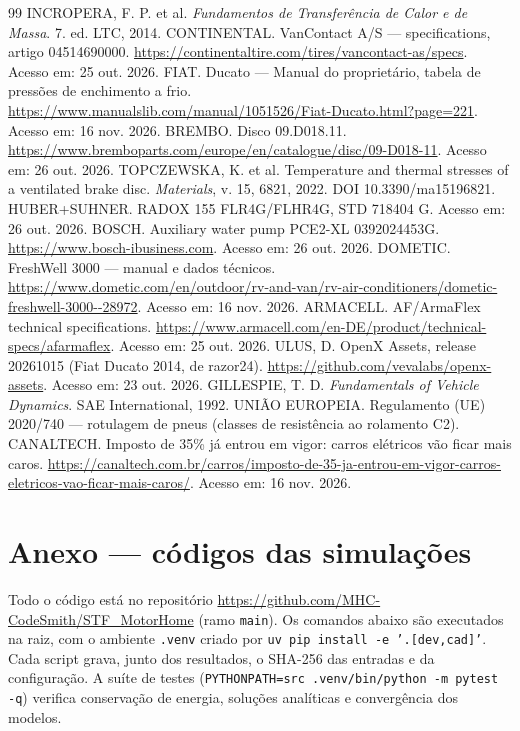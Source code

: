\documentclass[11pt,a4paper]{article}
\newcommand{\cod}[1]{\texttt{\small #1}}
\begin{document}
\begin{thebibliography}{99}
 INCROPERA, F. P. et al. \emph{Fundamentos de Transferência de Calor e de Massa}. 7. ed. LTC, 2014.
 CONTINENTAL. VanContact A/S — specifications, artigo 04514690000. \url{https://continentaltire.com/tires/vancontact-as/specs}. Acesso em: 25 out. 2026.
 FIAT. Ducato — Manual do proprietário, tabela de pressões de enchimento a frio. \url{https://www.manualslib.com/manual/1051526/Fiat-Ducato.html?page=221}. Acesso em: 16 nov. 2026.
 BREMBO. Disco 09.D018.11. \url{https://www.bremboparts.com/europe/en/catalogue/disc/09-D018-11}. Acesso em: 26 out. 2026.
 TOPCZEWSKA, K. et al. Temperature and thermal stresses of a ventilated brake disc. \emph{Materials}, v. 15, 6821, 2022. DOI 10.3390/ma15196821.
 HUBER+SUHNER. RADOX 155 FLR4G/FLHR4G, STD 718404 G. Acesso em: 26 out. 2026.
 BOSCH. Auxiliary water pump PCE2-XL 0392024453G. \url{https://www.bosch-ibusiness.com}. Acesso em: 26 out. 2026.
 DOMETIC. FreshWell 3000 — manual e dados técnicos. \url{https://www.dometic.com/en/outdoor/rv-and-van/rv-air-conditioners/dometic-freshwell-3000--28972}. Acesso em: 16 nov. 2026.
 ARMACELL. AF/ArmaFlex technical specifications. \url{https://www.armacell.com/en-DE/product/technical-specs/afarmaflex}. Acesso em: 25 out. 2026.
 ULUS, D. OpenX Assets, release 20261015 (Fiat Ducato 2014, de razor24). \url{https://github.com/vevalabs/openx-assets}. Acesso em: 23 out. 2026.
 GILLESPIE, T. D. \emph{Fundamentals of Vehicle Dynamics}. SAE International, 1992.
 UNIÃO EUROPEIA. Regulamento (UE) 2020/740 — rotulagem de pneus (classes de resistência ao rolamento C2).
 CANALTECH. Imposto de 35\% já entrou em vigor: carros elétricos vão ficar mais caros. \url{https://canaltech.com.br/carros/imposto-de-35-ja-entrou-em-vigor-carros-eletricos-vao-ficar-mais-caros/}. Acesso em: 16 nov. 2026.
\end{thebibliography}

\appendix
\section{Anexo — códigos das simulações}\label{sec:anexo}

Todo o código está no repositório \url{https://github.com/MHC-CodeSmith/STF_MotorHome}
(ramo \cod{main}). Os comandos abaixo são executados na raiz, com o ambiente
\cod{.venv} criado por \cod{uv pip install -e '.[dev,cad]'}. Cada script grava, junto
dos resultados, o SHA-256 das entradas e da configuração. A suíte de testes
(\cod{PYTHONPATH=src .venv/bin/python -m pytest -q}) verifica conservação de energia,
soluções analíticas e convergência dos modelos.
\end{document}
